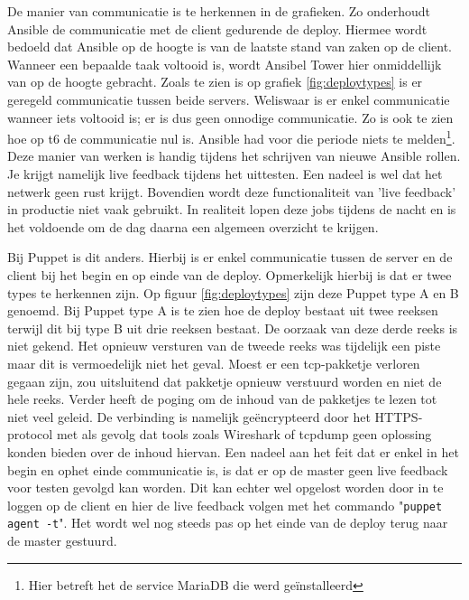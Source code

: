 De manier van communicatie is te herkennen in de grafieken. Zo onderhoudt Ansible de communicatie met de client gedurende de deploy. Hiermee wordt bedoeld dat Ansible op de hoogte is van de laatste stand van zaken op de client. Wanneer een bepaalde taak voltooid is, wordt Ansibel Tower hier onmiddellijk van op de hoogte gebracht. Zoals te zien is op grafiek \ref{fig:deploytypes} is er geregeld communicatie tussen beide servers. Weliswaar is er enkel communicatie wanneer iets voltooid is; er is dus geen onnodige communicatie. Zo is ook te zien hoe op t6 de communicatie nul is. Ansible had voor die periode niets te melden\footnote{Hier betreft het de service MariaDB die werd ge\"installeerd}. \newline
 Deze manier van werken is handig tijdens het schrijven van nieuwe Ansible rollen. Je krijgt namelijk live feedback tijdens het uittesten. Een nadeel is wel dat het netwerk geen rust krijgt. Bovendien wordt deze functionaliteit van 'live feedback' in productie niet vaak gebruikt. In realiteit lopen deze jobs tijdens de nacht en is het voldoende om de dag daarna een algemeen overzicht te krijgen.\newline

Bij Puppet is dit anders. Hierbij is er enkel communicatie tussen de server en de client bij het begin en op einde van de deploy. Opmerkelijk hierbij is dat er twee types te herkennen zijn. Op figuur \ref{fig:deploytypes} zijn deze Puppet type A en B genoemd. Bij Puppet type A is te zien hoe de deploy bestaat uit twee reeksen terwijl dit bij type B uit drie reeksen bestaat. De oorzaak van deze derde reeks is niet gekend. Het opnieuw versturen van de tweede reeks was tijdelijk een piste maar dit is vermoedelijk niet het geval. Moest er een tcp-pakketje verloren gegaan zijn, zou uitsluitend dat pakketje opnieuw verstuurd worden en niet de hele reeks. Verder heeft de poging om de inhoud van de pakketjes te lezen tot niet veel geleid. De verbinding is namelijk ge\"encrypteerd door het HTTPS-protocol met als gevolg dat tools zoals Wireshark of tcpdump geen oplossing konden bieden over de inhoud hiervan.\newline
Een nadeel aan het feit dat er enkel in het begin en ophet einde communicatie is, is dat er op de master geen live feedback voor testen gevolgd kan worden. Dit kan echter wel opgelost worden door in te loggen op de client en hier de live feedback volgen met het commando "\texttt{puppet agent -t}". Het wordt wel nog steeds pas op het einde van de deploy terug naar de master gestuurd.
 \newline


